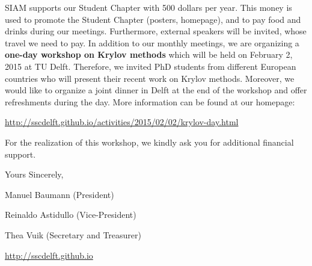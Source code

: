 \documentclass[a4paper,10pt]{article}
\begin{document}
\bigskip
SIAM supports our Student Chapter with 500 dollars per year. This money is used to promote the Student Chapter (posters, homepage), and to pay food and drinks during our meetings. Furthermore, external speakers will be invited, whose travel we need to pay. In addition to our monthly meetings, we are organizing a \textbf{one-day workshop on Krylov methods} which will be held on February 2, 2015 at TU Delft. Therefore, we invited PhD students from different European countries who will present their recent work on Krylov methods. Moreover, we would like to organize a joint dinner in Delft at the end of the workshop and offer refreshments during the day. More information can be found at our homepage:
\begin{center}
 \url{http://sscdelft.github.io/activities/2015/02/02/krylov-day.html}
\end{center}



\bigskip
\noindent For the realization of this workshop, we kindly ask you for additional financial support.

\bigskip
\noindent Yours Sincerely,

\bigskip 
\bigskip

\noindent Manuel Baumann (President)

\noindent Reinaldo Astidullo (Vice-President)

\noindent Thea Vuik (Secretary and Treasurer)

\noindent \url{http://sscdelft.github.io}
\end{document}
